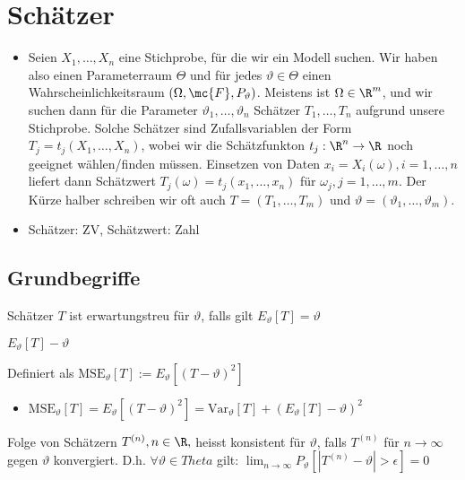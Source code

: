 
\section{Schätzer}
\begin{itemize}
    \item Seien $X_1, \dots, X_n$ eine Stichprobe, für die wir ein Modell suchen. Wir haben also einen Parameterraum $\Theta$ und für jedes $\vartheta \in \Theta$ einen Wahrscheinlichkeitsraum $(\Omega, \mc{F}, P_\vartheta)$. Meistens ist $\Omega \in \R^m$, und wir suchen dann für die Parameter $\vartheta_1, \dots, \vartheta_n$ Schätzer $T_1, \dots, T_n$ aufgrund unsere Stichprobe. Solche Schätzer sind Zufallsvariablen der Form $T_j = t_j(X_1, \dots, X_n)$, wobei wir die Schätzfunkton $t_j: \R^n \to \R$ noch geeignet wählen/finden müssen. Einsetzen von Daten $x_i = X_i(\omega), i = 1, \dots, n$ liefert dann Schätzwert $T_j(\omega) = t_j(x_1, \dots, x_n)$ für $\omega_j, j = 1, \dots, m$. Der Kürze halber schreiben wir oft auch $T = (T_1, \dots, T_m)$ und $\vartheta = (\vartheta_1, \dots, \vartheta_m)$.
    \item Schätzer: ZV, Schätzwert: Zahl
\end{itemize}

\subsection{Grundbegriffe}
\begin{itemize}
     Schätzer $T$ ist erwartungstreu für $\vartheta$, falls gilt $E_\vartheta[T] = \vartheta$
        \begin{itemize}
             $E_\vartheta[T] - \vartheta$
        \end{itemize}
     Definiert als $\text{MSE}_\vartheta[T] := E_\vartheta[(T - \vartheta)^2]$
        \begin{itemize}
            \item $\text{MSE}_\vartheta[T] = E_\vartheta[(T - \vartheta)^2] = \text{Var}_\vartheta[T] + (E_\vartheta[T] - \vartheta)^2$
        \end{itemize}
     Folge von Schätzern $T^{(n)}, n \in \R,$ heisst konsistent für $\vartheta$, falls $T^{(n)}$ für $n \to \infty$ gegen $\vartheta$ konvergiert. D.h. $\forall \vartheta \in Theta$ gilt: $\lim_{n \to \infty} P_\vartheta[|T^{(n)} - \vartheta| > \epsilon] = 0$
\end{itemize}

